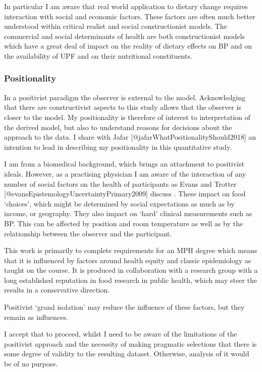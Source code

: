 \documentclass[
]{article}
\begin{document}
In particular I am aware that real world application to dietary change
requires interaction with social and economic factors. These factors are
often much better understood within critical realist and social
constructionist models. The commercial and social determinants of health
are both constructionist models which have a great deal of impact on the
reality of dietary effects on BP and on the availability of UPF and on
their nutritional constituents.

\hypertarget{positionality}{%
\subsubsection{Positionality}\label{positionality}}

In a positivist paradigm the observer is external to the model.
Acknowledging that there are constructivist aspects to this study allows
that the observer is closer to the model. My positionality is therefore
of interest to interpretation of the derived model, but also to
understand reasons for decisions about the approach to the data. I share
with Jafar {[}@jafarWhatPositionalityShould2018{]} an intention to lead
in describing my positionality in this quantitative study.

I am from a biomedical background, which brings an attachment to
positivist ideals. However, as a practising physician I am aware of the
interaction of any number of social factors on the health of
participants as Evans and Trotter
{[}@evansEpistemologyUncertaintyPrimary2009{]} discuss . These impact on
food `choices', which might be determined by social expectations as much
as by income, or geography. They also impact on `hard' clinical
measurements such as BP. This can be affected by position and room
temperature as well as by the relationship between the observer and the
participant.

This work is primarily to complete requirements for an MPH degree which
means that it is influenced by factors around health equity and classic
epidemiology as taught on the course. It is produced in collaboration
with a research group with a long established reputation in food
research in public health, which may steer the results in a conservative
direction.

Positivist `grand isolation' may reduce the influence of these factors,
but they remain as influences.

I accept that to proceed, whilst I need to be aware of the limitations
of the positivist approach and the necessity of making pragmatic
selections that there is some degree of validity to the resulting
dataset. Otherwise, analysis of it would be of no purpose.
\end{document}
